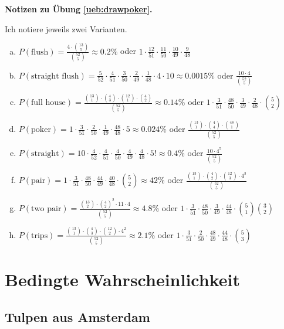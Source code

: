 \documentclass[%
11pt,%
twoside,%
titlepage,%
german,%
headsepline%
]{scrartcl}
\newcommand{\concatueb}[1]{ueb:#1}%
\newcommand{\concatlsg}[1]{lsg:#1}%
\newenvironment{lsg}[1]{%
    \par\noindent\textbf{Notizen zu Übung \ref{\concatueb{#1}}.}%
    \label{\concatlsg{#1}}
}{%
    \par%
}
\begin{document}
\begin{lsg}{drawpoker}
Ich notiere jeweils zwei Varianten.
\begin{enumerate}[a)]
\item $P(\text{flush})=\frac{4\cdot\binom{13}{5}}{\binom{52}{5}}\approx0.2\%$ oder $1\cdot\frac{12}{51}\cdot\frac{11}{50}\cdot\frac{10}{49}\cdot\frac{9}{48}$
\item $P(\text{straight flush})=\frac{5}{52}\cdot\frac{4}{51}\cdot\frac{3}{50}\cdot\frac{2}{49}\cdot\frac{1}{48}\cdot4\cdot10\approx0.0015\%$ oder $\frac{10\cdot4}{\binom{52}{5}}$
\item $P(\text{full house})=\frac{\binom{13}{1}\cdot\binom{4}{3}\cdot\binom{12}{1}\cdot\binom{4}{2}}{\binom{52}{5}}\approx0.14\%$ oder $1\cdot\frac{3}{51}\cdot\frac{48}{50}\cdot\frac{3}{49}\cdot\frac{2}{48}\cdot\binom{5}{2}$
\item $P(\text{poker})=1\cdot\frac{3}{51}\cdot\frac{2}{50}\cdot\frac{1}{49}\cdot\frac{48}{48}\cdot 5\approx0.024\%$ oder $\frac{\binom{13}{1}\cdot\binom{4}{4}\cdot\binom{48}{1}}{\binom{52}{5}}$
\item $P(\text{straight})=10\cdot\frac{4}{52}\cdot\frac{4}{51}\cdot\frac{4}{50}\cdot\frac{4}{49}\cdot\frac{4}{48}\cdot 5!\approx0.4\%$ oder $\frac{10\cdot4^5}{\binom{52}{5}}$
\item $P(\text{pair})=1\cdot\frac{3}{51}\cdot\frac{48}{50}\cdot\frac{44}{49}\cdot\frac{40}{48}\cdot\binom{5}{2}\approx42\%$ oder $\frac{\binom{13}{1}\cdot\binom{4}{2}\cdot\binom{12}{3}\cdot4^3}{\binom{52}{5}}$
\item $P(\text{two pair})=\frac{\binom{13}{2}\cdot\binom{4}{2}^{2}\cdot11\cdot 4}{\binom{52}{5}}\approx4.8\%$ oder $1\cdot\frac{3}{51}\cdot\frac{48}{50}\cdot\frac{3}{49}\cdot\frac{44}{48}\cdot\binom{5}{1}\binom{3}{2}$
\item $P(\text{trips})=\frac{\binom{13}{1}\cdot\binom{4}{3}\cdot\binom{12}{2}\cdot4^{2}}{\binom{52}{5}}\approx2.1\%$ oder $1\cdot\frac{3}{51}\cdot\frac{2}{50}\cdot\frac{48}{49}\cdot\frac{44}{48}\cdot\binom{5}{3}$
\end{enumerate}
\end{lsg}

\clearpage


\section{Bedingte Wahrscheinlichkeit}
\subsection{Tulpen aus Amsterdam}
\end{document}
